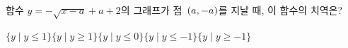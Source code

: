 함수 $y=-\sqrt{x-a}+a+2$의 그래프가 점~$(a{,}\mkern3mu\mathopen{}-a)$를 지날 때, 이 함수의 치역은? 
\begin{choices32}{$\{y \mid y\le 1\}$}{$\{y \mid y\ge 1\}$}{$\{y \mid y\le 0\}$}{$\{y \mid y\le -1\}$}{$\{y \mid y\ge -1\}$}\end{choices32}
